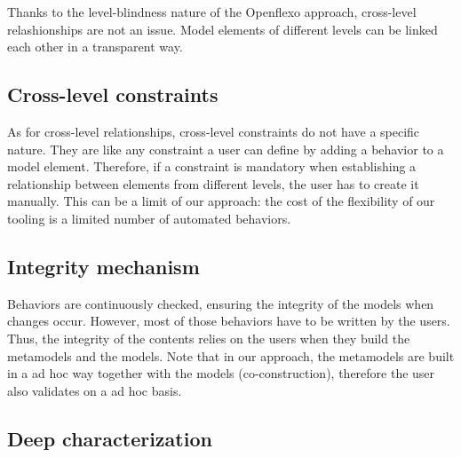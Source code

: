   Thanks to the level-blindness nature of the Openflexo approach, cross-level
  relashionships are not an issue. Model elements of different levels can be
  linked each other in a transparent way. %

  \subsection{Cross-level constraints}


  As for cross-level relationships, cross-level constraints do not have a
  specific nature. They are like any constraint a user can define by adding a behavior to a model element. Therefore, if a constraint is mandatory when establishing a
  relationship between elements from different levels, the user has to create
  it manually. This can be a limit of our approach: the cost of the flexibility of our tooling is a limited number of automated behaviors. 
  
  

  \subsection{Integrity mechanism}


  Behaviors are continuously checked, ensuring the integrity of the models when changes occur. 
  However, most of those behaviors have to be written by the users. 
  Thus, the integrity of the contents relies on the users when they build the metamodels and the models.
  Note that in our approach, the metamodels are built in a ad hoc way together with the models
  (co-construction), therefore the user also validates on a ad hoc basis.

  \subsection{Deep characterization}



